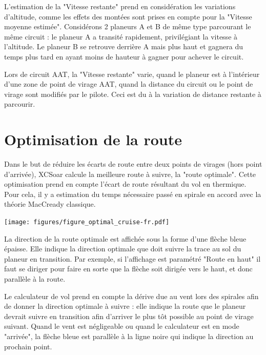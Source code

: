 L'estimation de la "Vitesse restante" prend en considération les variations d'altitude, comme les effets des montées sont prises en compte pour la "Vitesse moyenne estimée". Considérons 2 planeurs A et B de même type parcourant le même circuit : le planeur A a transité rapidement, privilégiant la vitesse à l'altitude. Le planeur B se retrouve derrière A mais plus haut et gagnera du temps plus tard en ayant moins de hauteur à gagner pour achever le circuit.

Lors de circuit AAT, la "Vitesse restante" varie, quand le planeur est à l'intérieur d'une zone de point de virage AAT, quand la distance du circuit ou le point de virage sont modifiés par le pilote. Ceci est du à la variation de distance restante à parcourir.


\section{Optimisation de la route}
Dans le but de réduire les écarts de route entre deux points de virages (hors point d'arrivée), XCSoar calcule la meilleure route à suivre, la "route optimale". Cette optimisation prend en compte l'écart de route résultant du vol en thermique. Pour cela, il y a estimation du temps nécessaire passé en spirale en accord avec la théorie MacCready classique.

\begin{center}
\begin{maxipage}
\centering
\def\svgwidth{0.8\linewidth}
\texttt{[image: figures/figure\_optimal\_cruise-fr.pdf]}
\end{maxipage}
\end{center}

La direction de la route optimale est affichée sous la forme d'une flèche bleue épaisse. Elle indique la direction optimale que doit suivre la trace au sol du planeur en transition. Par exemple, si l'affichage est paramétré "Route en haut" il faut se diriger pour faire en sorte que la flèche soit dirigée vers le haut, et donc parallèle à la route.

Le calculateur de vol prend en compte la dérive due au vent lors des spirales afin de donner la direction optimale à suivre : elle indique la route que le planeur devrait suivre en transition afin d'arriver le plus tôt possible au point de virage suivant. Quand le vent est négligeable ou quand le calculateur est en mode "arrivée", la flèche bleue est parallèle à la ligne noire qui indique la direction au prochain point.

